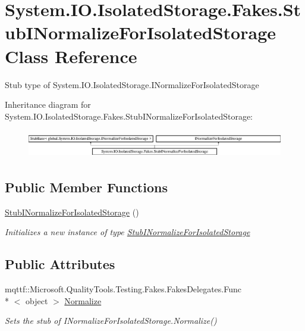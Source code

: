 \hypertarget{class_system_1_1_i_o_1_1_isolated_storage_1_1_fakes_1_1_stub_i_normalize_for_isolated_storage}{\section{System.\-I\-O.\-Isolated\-Storage.\-Fakes.\-Stub\-I\-Normalize\-For\-Isolated\-Storage Class Reference}
\label{class_system_1_1_i_o_1_1_isolated_storage_1_1_fakes_1_1_stub_i_normalize_for_isolated_storage}
}


Stub type of System.\-I\-O.\-Isolated\-Storage.\-I\-Normalize\-For\-Isolated\-Storage 


Inheritance diagram for System.\-I\-O.\-Isolated\-Storage.\-Fakes.\-Stub\-I\-Normalize\-For\-Isolated\-Storage\-:\begin{figure}[H]
\begin{center}
\leavevmode
\includegraphics[height=1.236203cm]{class_system_1_1_i_o_1_1_isolated_storage_1_1_fakes_1_1_stub_i_normalize_for_isolated_storage}
\end{center}
\end{figure}
\subsection*{Public Member Functions}
\begin{DoxyCompactItemize}
\item 
\hyperlink{class_system_1_1_i_o_1_1_isolated_storage_1_1_fakes_1_1_stub_i_normalize_for_isolated_storage_a01a593e1eed123f55e8a4c0a82c04d85}{Stub\-I\-Normalize\-For\-Isolated\-Storage} ()
\begin{DoxyCompactList}\small\item\em Initializes a new instance of type \hyperlink{class_system_1_1_i_o_1_1_isolated_storage_1_1_fakes_1_1_stub_i_normalize_for_isolated_storage}{Stub\-I\-Normalize\-For\-Isolated\-Storage}\end{DoxyCompactList}\end{DoxyCompactItemize}
\subsection*{Public Attributes}
\begin{DoxyCompactItemize}
\item 
mqttf\-::\-Microsoft.\-Quality\-Tools.\-Testing.\-Fakes.\-Fakes\-Delegates.\-Func\\*
$<$ object $>$ \hyperlink{class_system_1_1_i_o_1_1_isolated_storage_1_1_fakes_1_1_stub_i_normalize_for_isolated_storage_a8d094db0bbdc17ffec5d5898df398432}{Normalize}
\begin{DoxyCompactList}\small\item\em Sets the stub of I\-Normalize\-For\-Isolated\-Storage.\-Normalize()\end{DoxyCompactList}\end{DoxyCompactItemize}


